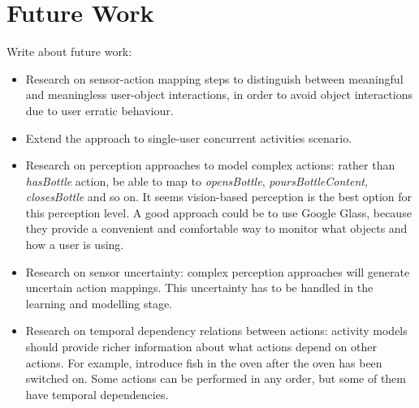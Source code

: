 \section{Future Work}
\label{sec:conclusions:future}

Write about future work:

\begin{itemize}
 \item Research on sensor-action mapping steps to distinguish between meaningful and meaningless user-object interactions, in order to avoid object interactions due to user erratic behaviour.
 \item Extend the approach to single-user concurrent activities scenario.
 \item Research on perception approaches to model complex actions: rather than \textit{hasBottle} action, be able to map to \textit{opensBottle}, \textit{poursBottleContent}, \textit{closesBottle} and so on. It seems vision-based perception is the best option for this perception level. A good approach could be to use Google Glass, because they provide a convenient and comfortable way to monitor what objects and how a user is using.
 \item Research on sensor uncertainty: complex perception approaches will generate uncertain action mappings. This uncertainty has to be handled in the learning and modelling stage.
 \item Research on temporal dependency relations between actions: activity models should provide richer information about what actions depend on other actions. For example, introduce fish in the oven after the oven has been switched on. Some actions can be performed in any order, but some of them have temporal dependencies.
\end{itemize}
